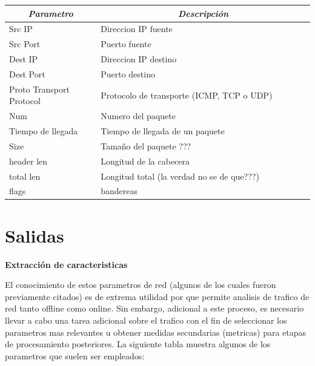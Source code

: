 \documentclass[12pt]{article}
\begin{document}
\begin{table}[htbp]
\centering
\begin{tabular}{|p{0.3\linewidth}|p{0.7\linewidth}|}
\hline
\multicolumn{1}{|c|}{\textit{\textbf{Parametro}}} & \multicolumn{1}{c|}{\textit{\textbf{Descripción}}} \tabularnewline \hline
Src IP & Direccion IP fuente \tabularnewline \hline
Src Port &  Puerto fuente \tabularnewline \hline  
Dest IP & Direccion IP destino \tabularnewline \hline
Dest Port & Puerto destino \tabularnewline \hline
Proto Transport Protocol & Protocolo de transporte  (ICMP, TCP o UDP)  \tabularnewline \hline
Num & Numero del paquete \tabularnewline \hline
Tiempo de llegada & Tiempo de llegada de un paquete \tabularnewline \hline
Size & Tamaño del paquete ??? \tabularnewline \hline
header len & Longitud de la cabecera \tabularnewline \hline
total len & Longitud total (la verdad no se de que???) \tabularnewline \hline
flags & bandereas \tabularnewline \hline
\end{tabular}
\end{table}

\section{Salidas}

\textbf{Extracción de caracteristicas}

El conocimiento de estos parametros de red (algunos de los cuales fueron previamente citados) es de extrema utilidad por que permite analisis de trafico de red tanto offline como online. Sin embargo, adicional a este proceso, es necesario llevar a cabo una tarea adicional sobre el trafico con el fin de seleccionar los parametros mas relevantes u obtener medidas secundarias (metricas) para etapas de procesamiento posteriores. La siguiente tabla muestra algunos de los parametros que suelen ser empleados:
\end{document}
